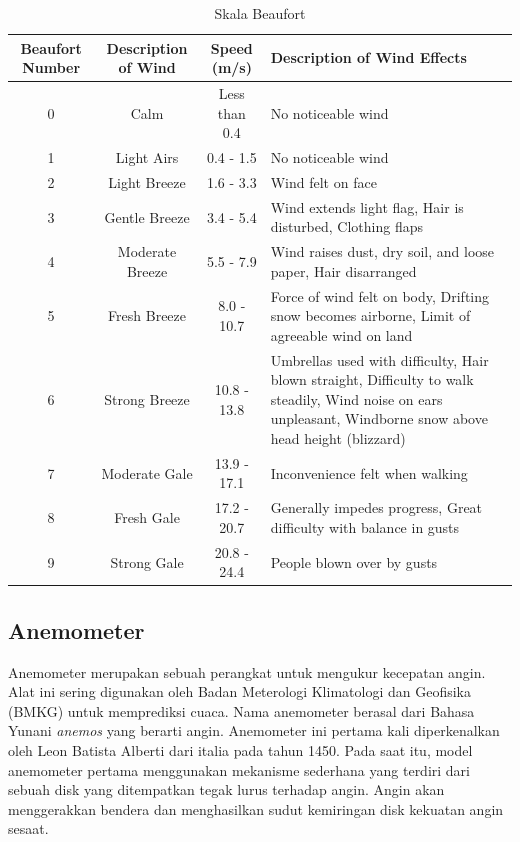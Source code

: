 \begin{table}[h!]
	\label{tbl:beaufortScale}
	\centering
	\caption{Skala Beaufort \parencite{Abdillah2022}}
	\begin{tabular}{|c|c|c|p{4cm}|}
		\hline
		\rowcolor{lightgray}
		Beaufort Number  & Description of Wind & Speed (m/s) & Description of Wind Effects \\
		\hline
		0 & Calm & Less than 0.4 & No noticeable wind \\
		\hline
		1 & Light Airs & 0.4 - 1.5 & No noticeable wind \\
		\hline
		2 & Light Breeze & 1.6 - 3.3 & Wind felt on face \\
		\hline
		3 & Gentle Breeze & 3.4 - 5.4 & Wind extends light
		flag, Hair is
		disturbed, Clothing
		flaps \\
		\hline
		4 & Moderate Breeze & 5.5 - 7.9 & Wind raises dust,
		dry soil, and loose
		paper, Hair
		disarranged \\
		\hline
		5 & Fresh Breeze & 8.0 - 10.7 & Force of wind felt
		on body, Drifting
		snow becomes
		airborne, Limit of
		agreeable wind on
		land \\
		\hline
		6 & Strong Breeze & 10.8 - 13.8 & Umbrellas used
		with difficulty, Hair
		blown straight,
		Difficulty to walk
		steadily, Wind
		noise on ears
		unpleasant,
		Windborne snow
		above head height
		(blizzard) \\
		\hline
		7 & Moderate Gale & 13.9 - 17.1 & Inconvenience felt
		when walking \\
		\hline
		8 & Fresh Gale & 17.2 - 20.7 & Generally impedes
		progress, Great
		difficulty with
		balance in gusts \\
		\hline
		9 & Strong Gale & 20.8 - 24.4 & People blown over
		by gusts \\
		\hline
	\end{tabular}
\end{table}
	
\subsection{Anemometer}

Anemometer merupakan sebuah perangkat untuk mengukur  kecepatan angin. Alat ini sering 
digunakan oleh Badan Meterologi Klimatologi dan Geofisika (BMKG) untuk memprediksi cuaca. Nama anemometer berasal dari Bahasa Yunani \textit{anemos} yang berarti angin. Anemometer ini pertama kali diperkenalkan 
oleh Leon Batista Alberti dari italia pada tahun 1450. Pada saat itu, model anemometer pertama menggunakan mekanisme sederhana yang terdiri dari sebuah disk 
yang ditempatkan tegak lurus terhadap angin. Angin akan menggerakkan bendera dan menghasilkan sudut kemiringan disk kekuatan angin sesaat. 

